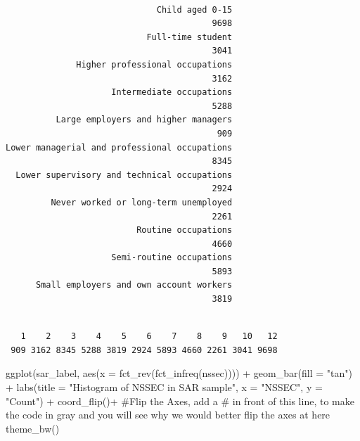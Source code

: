 \documentclass[
  letterpaper,
  DIV=11,
  numbers=noendperiod]{scrreprt}
\newenvironment{Shaded}{\begin{snugshade}}{\end{snugshade}}
\newcommand{\AttributeTok}[1]{\textcolor[rgb]{0.40,0.45,0.13}{#1}}
\newcommand{\CommentTok}[1]{\textcolor[rgb]{0.37,0.37,0.37}{#1}}
\newcommand{\FunctionTok}[1]{\textcolor[rgb]{0.28,0.35,0.67}{#1}}
\newcommand{\NormalTok}[1]{\textcolor[rgb]{0.00,0.23,0.31}{#1}}
\newcommand{\SpecialCharTok}[1]{\textcolor[rgb]{0.37,0.37,0.37}{#1}}
\newcommand{\StringTok}[1]{\textcolor[rgb]{0.13,0.47,0.30}{#1}}
\begin{document}
\begin{verbatim}

                              Child aged 0-15 
                                         9698 
                            Full-time student 
                                         3041 
              Higher professional occupations 
                                         3162 
                     Intermediate occupations 
                                         5288 
          Large employers and higher managers 
                                          909 
Lower managerial and professional occupations 
                                         8345 
  Lower supervisory and technical occupations 
                                         2924 
         Never worked or long-term unemployed 
                                         2261 
                          Routine occupations 
                                         4660 
                     Semi-routine occupations 
                                         5893 
      Small employers and own account workers 
                                         3819 
\end{verbatim}

\begin{Shaded}
\end{Shaded}

\begin{verbatim}

   1    2    3    4    5    6    7    8    9   10   12 
 909 3162 8345 5288 3819 2924 5893 4660 2261 3041 9698 
\end{verbatim}

\begin{Shaded}
\begin{Highlighting}[]
\FunctionTok{ggplot}\NormalTok{(sar\_label, }\FunctionTok{aes}\NormalTok{(}\AttributeTok{x =} \FunctionTok{fct\_rev}\NormalTok{(}\FunctionTok{fct\_infreq}\NormalTok{(nssec)))) }\SpecialCharTok{+} 
  \FunctionTok{geom\_bar}\NormalTok{(}\AttributeTok{fill =} \StringTok{"tan"}\NormalTok{) }\SpecialCharTok{+} 
  \FunctionTok{labs}\NormalTok{(}\AttributeTok{title =} \StringTok{"Histogram of NSSEC in SAR sample"}\NormalTok{, }\AttributeTok{x =} \StringTok{"NSSEC"}\NormalTok{, }\AttributeTok{y =} \StringTok{"Count"}\NormalTok{) }\SpecialCharTok{+}
  \FunctionTok{coord\_flip}\NormalTok{()}\SpecialCharTok{+} \CommentTok{\#Flip the Axes, add a \# in front of this line, to make the code in gray and you will see why we would better flip the axes at here}
  \FunctionTok{theme\_bw}\NormalTok{() }
\end{Highlighting}
\end{Shaded}
\end{document}
